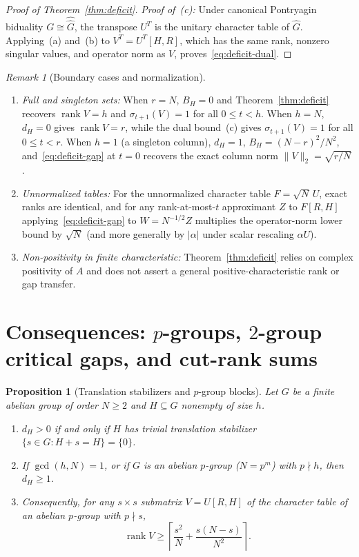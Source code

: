 \documentclass[11pt,reqno]{amsart}
\numberwithin{equation}{section}
\newtheorem{proposition}[theorem]{Proposition}
\theoremstyle{definition}
\theoremstyle{remark}
\newtheorem{remark}[theorem]{Remark}
\newcommand{\rank}{\operatorname{rank}}
\begin{document}
\begin{proof}[Proof of Theorem~\ref{thm:deficit}]
\smallskip
\noindent\emph{Proof of~(c):} Under canonical Pontryagin biduality $G\cong\widehat{\widehat{G}}$, the transpose $U^T$ is the unitary character table of $\widehat{G}$. Applying~(a) and~(b) to $V^T = U^T[H,R]$, which has the same rank, nonzero singular values, and operator norm as $V$, proves~\eqref{eq:deficit-dual}.
\end{proof}

\begin{remark}[Boundary cases and normalization]
\label{rem:endpoints}
\begin{enumerate}[label=(\arabic*),leftmargin=2em]
\item \emph{Full and singleton sets:} When $r=N$, $B_H=0$ and Theorem~\ref{thm:deficit} recovers $\rank V=h$ and $\sigma_{t+1}(V)=1$ for all $0\le t<h$. When $h=N$, $d_H=0$ gives $\rank V=r$, while the dual bound~(c) gives $\sigma_{t+1}(V)=1$ for all $0\le t<r$. When $h=1$ (a singleton column), $d_H=1$, $B_H=(N-r)^2/N^2$, and~\eqref{eq:deficit-gap} at $t=0$ recovers the exact column norm $\|V\|_2=\sqrt{r/N}$.
\item \emph{Unnormalized tables:} For the unnormalized character table $F = \sqrt{N}\,U$, exact ranks are identical, and for any rank-at-most-$t$ approximant $Z$ to $F[R,H]$ applying~\eqref{eq:deficit-gap} to $W = N^{-1/2}Z$ multiplies the operator-norm lower bound by $\sqrt{N}$ (and more generally by $|\alpha|$ under scalar rescaling $\alpha U$).
\item \emph{Non-positivity in finite characteristic:} Theorem~\ref{thm:deficit} relies on complex positivity of $A$ and does not assert a general positive-characteristic rank or gap transfer.
\end{enumerate}
\end{remark}

\section{Consequences: $p$-groups, $2$-group critical gaps, and cut-rank sums}
\label{sec:consequences}

\begin{proposition}[Translation stabilizers and $p$-group blocks]
\label{prop:stabilizer}
Let $G$ be a finite abelian group of order $N\ge 2$ and $H\subseteq G$ nonempty of size $h$.
\begin{enumerate}[label=(\alph*),leftmargin=2em]
\item $d_H > 0$ if and only if $H$ has trivial translation stabilizer $\{s\in G : H+s=H\}=\{0\}$.
\item If $\gcd(h,N)=1$, or if $G$ is an abelian $p$-group ($N=p^m$) with $p\nmid h$, then $d_H\ge 1$.
\item Consequently, for any $s\times s$ submatrix $V=U[R,H]$ of the character table of an abelian $p$-group with $p\nmid s$,
\begin{equation}
\label{eq:pgroup-sq}
\rank V \ge \left\lceil \frac{s^2}{N} + \frac{s(N-s)}{N^2}\right\rceil.
\end{equation}
\end{enumerate}
\end{proposition}
\end{document}
